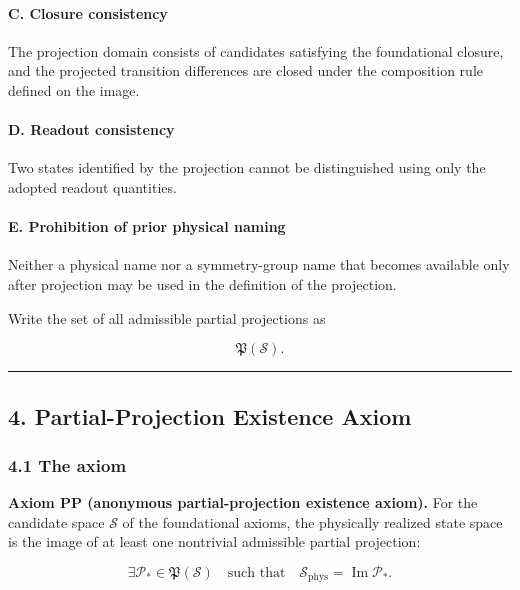 \documentclass[
  a4paper,
]{article}
\begin{document}
\paragraph{C. Closure consistency}\label{c.-closure-consistency}

The projection domain consists of candidates satisfying the foundational
closure, and the projected transition differences are closed under the
composition rule defined on the image.

\paragraph{D. Readout consistency}\label{d.-readout-consistency}

Two states identified by the projection cannot be distinguished using
only the adopted readout quantities.

\paragraph{E. Prohibition of prior physical
naming}\label{e.-prohibition-of-prior-physical-naming}

Neither a physical name nor a symmetry-group name that becomes available
only after projection may be used in the definition of the projection.

Write the set of all admissible partial projections as

\[
\mathfrak P(\mathscr S).
\]

\begin{center}\rule{0.5\linewidth}{0.5pt}\end{center}

\subsection{4. Partial-Projection Existence
Axiom}\label{partial-projection-existence-axiom}

\subsubsection{4.1 The axiom}\label{the-axiom}

\textbf{Axiom PP (anonymous partial-projection existence axiom).} For
the candidate space \(\mathscr S\) of the foundational axioms, the
physically realized state space is the image of at least one nontrivial
admissible partial projection:

\[
\boxed{
\exists\mathcal P_*
\in
\mathfrak P(\mathscr S)
\quad\text{such that}\quad
\mathscr S_{\mathrm{phys}}
=
\operatorname{Im}\mathcal P_*.
}
\]
\end{document}
